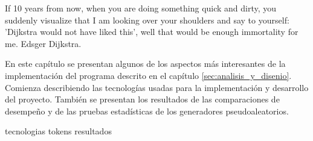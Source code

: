 %
%
%

\label{sec:implementacion}
{%
  If 10 years from now, when you are doing something quick and dirty, you
  suddenly visualize that I am looking over your shoulders and say to
  yourself: 'Dijkstra would not have liked this', well that would be enough
  immortality for me.%
}
{%
   Edsger Dijkstra.%
}

\noindent
En este capítulo se presentan algunos de los aspectos más interesantes de
la implementación del programa descrito en el capítulo
\ref{sec:analisis_y_disenio}. Comienza describiendo las tecnologías
usadas para la implementación y desarrollo del proyecto. También se presentan
los resultados de las comparaciones de desempeño y de las pruebas estadísticas
de los generadores pseudoaleatorios.

{tecnologias}
{tokens}
{resultados}
